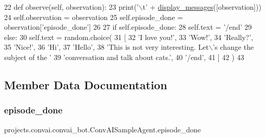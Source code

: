 \begin{DoxyCode}
22     \textcolor{keyword}{def }observe(self, observation):
23         print(\textcolor{stringliteral}{'\(\backslash\)t'} + \hyperlink{namespaceparlai_1_1utils_1_1misc_a146f303a4c4b34993458968c74b55d2f}{display\_messages}([observation]))
24         self.observation = observation
25         self.episode\_done = observation[\textcolor{stringliteral}{'episode\_done'}]
26 
27         \textcolor{keywordflow}{if} self.episode\_done:
28             self.text = \textcolor{stringliteral}{'/end'}
29         \textcolor{keywordflow}{else}:
30             self.text = random.choice(
31                 [
32                     \textcolor{stringliteral}{'I love you!'},
33                     \textcolor{stringliteral}{'Wow!'},
34                     \textcolor{stringliteral}{'Really?'},
35                     \textcolor{stringliteral}{'Nice!'},
36                     \textcolor{stringliteral}{'Hi'},
37                     \textcolor{stringliteral}{'Hello'},
38                     \textcolor{stringliteral}{'This is not very interesting. Let\(\backslash\)'s change the subject of the '}
39                     \textcolor{stringliteral}{'conversation and talk about cats.'},
40                     \textcolor{stringliteral}{'/end'},
41                 ]
42             )
43 
\end{DoxyCode}


\subsection{Member Data Documentation}
\mbox{\label{classprojects_1_1convai_1_1convai__bot_1_1ConvAISampleAgent_a8bdf2e2fcc4defb29becfd02e23f058e}} 
\subsubsection{\texorpdfstring{episode\+\_\+done}{episode\_done}}
{\footnotesize\ttfamily projects.\+convai.\+convai\+\_\+bot.\+Conv\+A\+I\+Sample\+Agent.\+episode\+\_\+done}



